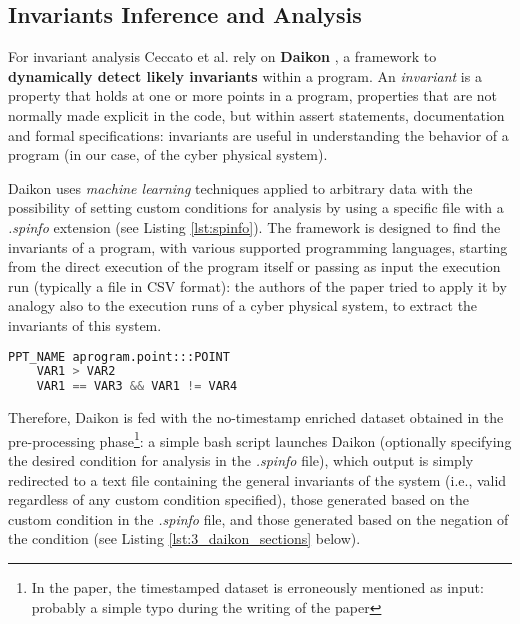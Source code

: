 \subsection{Invariants Inference and Analysis}
\label{subsec:3_ceccato_invariants}
For invariant analysis Ceccato et al. rely on \textbf{Daikon} \cite{daikon_site}, a framework to \textbf{dynamically detect likely invariants} within a program. An \textit{invariant} is a property that holds at one or more points in a program, properties that are not normally made explicit in the code, but within assert statements, documentation and formal specifications: invariants are useful in understanding the behavior of a program (in our case, of the cyber physical system).

Daikon uses \textit{machine learning} techniques applied to arbitrary data with the possibility of setting custom conditions for analysis by using a specific file \cite{daikon_spinfo} with a \textit{.spinfo} extension (see Listing \ref{lst:spinfo}). The framework is designed to find the invariants of a program, with various supported programming languages, starting from the direct execution of the program itself or passing as input the execution run (typically a file in CSV format): the authors of the paper tried to apply it by analogy also to the execution runs of a cyber physical system, to extract the invariants of this system.

\begin{lstlisting}[language=Python,numbers=none,caption={Generic example of a .spinfo file for customizing rules in Daikon},label=lst:spinfo]
	PPT_NAME aprogram.point:::POINT
	VAR1 > VAR2
	VAR1 == VAR3 && VAR1 != VAR4
\end{lstlisting}

Therefore, Daikon is fed with the no-timestamp enriched dataset obtained in the pre-processing phase\footnote{In the paper, the timestamped dataset is erroneously mentioned as input: probably a simple typo during the writing of the paper}: a simple bash script launches Daikon (optionally specifying the desired condition for analysis in the \textit{.spinfo} file), which output is simply redirected to a text file containing the general invariants of the system (i.e., valid regardless of any custom condition specified), those generated based on the custom condition in the \textit{.spinfo} file, and those generated based on the negation of the condition (see Listing \ref{lst:3_daikon_sections} below).

